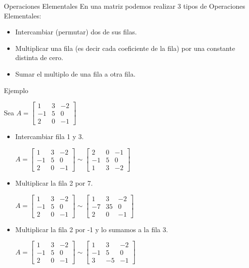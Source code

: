 {Operaciones Elementales}
En una matriz podemos realizar 3 tipos de Operaciones Elementales:

\begin{itemize}
\item
Intercambiar (permutar) dos de sus filas.
\item
Multiplicar una fila (es decir cada coeficiente de la fila) por una constante distinta de cero.
\item
Sumar el multiplo de una fila a otra fila.
\end{itemize}


{Ejemplo}

Sea  $ A= \begin{bmatrix}
1 &  3 & -2 \\
-1 &  5 & 0 \\
2 &  0 &  -1
\end{bmatrix}$


\begin{itemize}
\item
Intercambiar fila 1 y 3.

$ A= \begin{bmatrix}
1 &  3 & -2 \\
-1 &  5 & 0 \\
2 &  0 &  -1
\end{bmatrix}
\sim
\begin{bmatrix}
2 &  0 &  -1\\
-1 &  5 & 0 \\
1 &  3 & -2 
\end{bmatrix}
$

\item
Multiplicar la fila 2 por 7.

$ A= \begin{bmatrix}
1 &  3 & -2 \\
-1 &  5 & 0 \\
2 &  0 &  -1
\end{bmatrix}
\sim
\begin{bmatrix}
1 &  3 & -2 \\
-7 &  35 & 0 \\
2 &  0 &  -1
\end{bmatrix}$

\item
Multiplicar la fila 2 por -1 y lo sumamos a la fila 3.

$ A= \begin{bmatrix}
1 &  3 & -2 \\
-1 &  5 & 0 \\
2 &  0 &  -1
\end{bmatrix}
\sim
\begin{bmatrix}
1 &  3 & -2 \\
-1 &  5 & 0 \\
3 &  -5 &  -1
\end{bmatrix}
$
\end{itemize}


